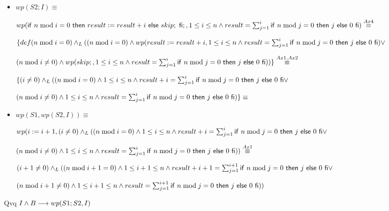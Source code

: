 \documentclass{article}
\begin{document}
\begin{itemize}
    \item $wp(S2; I) \equiv$

    $wp(\mathsf{if}\ n \bmod i = 0\ \mathsf{then}\ result:= result + i\ \mathsf{else}\ skip;\ \mathsf{fi};, 1 \leq i \leq n \wedge result = \sum_{j=1}^{i} \mathsf{if}\ n \bmod j = 0\ \mathsf{then}\ j\ \mathsf{else}\ 0\ \mathsf{fi}) \stackrel{Ax4}{\equiv}$

    $\{def(n \bmod i = 0) \land _L ((n \bmod i = 0) \wedge wp(result:= result + i, 1 \leq i \leq n \wedge result = \sum_{j=1}^{i} \mathsf{if}\ n \bmod j = 0\ \mathsf{then}\ j\ \mathsf{else}\ 0\ \mathsf{fi}) \vee$

    $ (n \bmod i \neq 0 ) \wedge wp(skip;, 1 \leq i \leq n \wedge result = \sum_{j=1}^{i} \mathsf{if}\ n \bmod j = 0\ \mathsf{then}\ j\ \mathsf{else}\ 0\ \mathsf{fi}))\} \stackrel{Ax1,Ax2}{\equiv}$

    $\{(i \neq 0) \land _L ((n \bmod i = 0) \wedge 1 \leq i \leq n \wedge result + i = \sum_{j=1}^{i} \mathsf{if}\ n \bmod j = 0\ \mathsf{then}\ j\ \mathsf{else}\ 0\ \mathsf{fi} \vee$

    $ (n \bmod i \neq 0 ) \wedge 1 \leq i \leq n \wedge result = \sum_{j=1}^{i} \mathsf{if}\ n \bmod j = 0\ \mathsf{then}\ j\ \mathsf{else}\ 0\ \mathsf{fi})\} \equiv$

    \item $wp(S1, wp(S2, I)) \equiv$

    $wp(i:= i + 1, (i \neq 0) \land _L ((n \bmod i = 0) \wedge 1 \leq i \leq n \wedge result + i = \sum_{j=1}^{i} \mathsf{if}\ n \bmod j = 0\ \mathsf{then}\ j\ \mathsf{else}\ 0\ \mathsf{fi} \vee$

    $ (n \bmod i \neq 0 ) \wedge 1 \leq i \leq n \wedge result = \sum_{j=1}^{i} \mathsf{if}\ n \bmod j = 0\ \mathsf{then}\ j\ \mathsf{else}\ 0\ \mathsf{fi})) \stackrel{Ax1}{\equiv}$

    $(i+1 \neq 0) \land _L ((n \bmod i+1 = 0) \wedge 1 \leq i+1 \leq n \wedge result + i+1 = \sum_{j=1}^{i+1} \mathsf{if}\ n \bmod j = 0\ \mathsf{then}\ j\ \mathsf{else}\ 0\ \mathsf{fi} \vee$

    $ (n \bmod i+1 \neq 0 ) \wedge 1 \leq i+1 \leq n \wedge result = \sum_{j=1}^{i+1} \mathsf{if}\ n \bmod j = 0\ \mathsf{then}\ j\ \mathsf{else}\ 0\ \mathsf{fi}))$

\end{itemize}

Qvq $I \wedge B \longrightarrow wp(S1;S2, I)$
\end{document}
